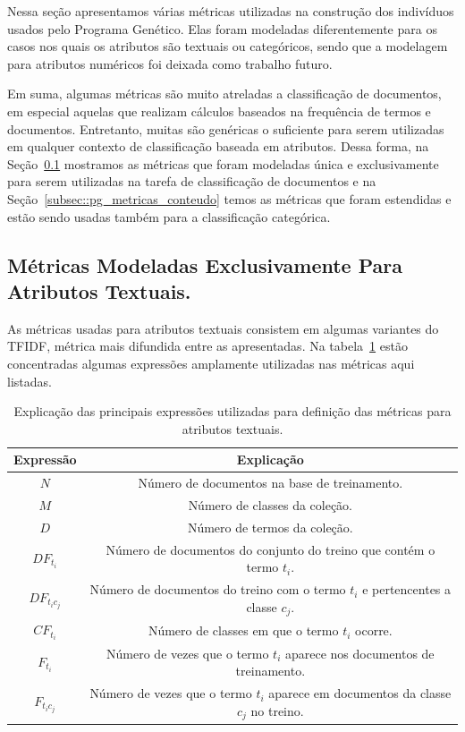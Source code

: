 Nessa seção apresentamos várias métricas utilizadas na construção dos indivíduos usados pelo Programa Genético. Elas foram modeladas diferentemente para os casos nos quais os atributos são textuais ou categóricos, sendo que a modelagem para atributos numéricos foi deixada como trabalho futuro. 

Em suma, algumas métricas são muito atreladas a classificação de documentos, em especial aquelas que realizam cálculos baseados na frequência de termos e documentos. 
Entretanto, muitas são genéricas o suficiente para serem utilizadas em qualquer contexto de classificação baseada em atributos.
Dessa forma, na Seção~\ref{subsec::pg_metricas_conteudo_textual} mostramos as métricas que foram modeladas única e exclusivamente para serem utilizadas na tarefa de classificação de documentos  e na Seção~\ref{subsec::pg_metricas_conteudo} temos as métricas que foram estendidas e estão sendo usadas também para a classificação categórica.

\subsection{Métricas Modeladas Exclusivamente Para Atributos Textuais.}
\label{subsec::pg_metricas_conteudo_textual}

As métricas usadas para atributos textuais consistem em algumas variantes do \textsc{TFIDF}, métrica mais difundida entre as apresentadas. Na tabela~\ref{table::metricas_textuais} estão concentradas algumas expressões amplamente utilizadas nas métricas aqui listadas.

\begin{table}[ht*]
\centering
\begin{tabular}{|c|c|}
\toprule
    \textbf{Expressão} & \textbf{Explicação} \\
\midrule
    $N$           & Número de documentos na base de treinamento. \tabularnewline \hline
    $M$           & Número de classes da coleção. \tabularnewline \hline
    $D$           & Número de termos da coleção. \tabularnewline \hline
    $DF_{t_i} $   & Número de documentos do conjunto do treino que contém o termo $t_i$. \tabularnewline \hline
    $DF_{t_ic_j}$ & Número de documentos do treino com o termo $t_i$ e pertencentes a classe $c_j$. \tabularnewline \hline
    $CF_{t_i}$    & Número de classes em que o termo $t_i$ ocorre. \tabularnewline \hline 
    $F_{t_i}$     & Número de vezes que o termo $t_i$ aparece nos documentos de treinamento. \tabularnewline \hline
    $F_{t_ic_j}$  & Número de vezes que o termo $t_i$ aparece em documentos da classe $c_j$ no treino. \tabularnewline 
\bottomrule
\end{tabular}
\caption{Explicação das principais expressões utilizadas para definição das métricas para atributos textuais.}
\label{table::metricas_textuais}
\end{table}


